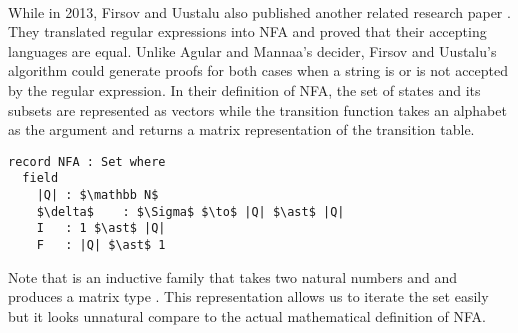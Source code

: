 \paragraph{} While in 2013, Firsov and Uustalu also published another related
research paper \cite{firsov2013}. They translated regular expressions
into NFA and proved that their accepting languages are
equal. Unlike Agular and Mannaa's decider, Firsov and Uustalu's
algorithm could generate proofs for both cases when a string is or is not
accepted by the regular expression. In their definition of NFA, the set of states
 and its subsets are represented as vectors while the transition function
\mb{\delta} takes an alphabet as the argument and returns a matrix
representation of the transition table. 
\begin{lstlisting}[mathescape=true,xleftmargin=.3\textwidth]
record NFA : Set where
  field
    |Q| : $\mathbb N$
    $\delta$    : $\Sigma$ $\to$ |Q| $\ast$ |Q|
    I   : 1 $\ast$ |Q|
    F   : |Q| $\ast$ 1
\end{lstlisting}

\par Note that \mb{\_\ast\_} is an inductive family that takes two
natural numbers  and  and
produces a matrix type . This representation allows us to
iterate the set easily but it looks unnatural compare to the actual 
mathematical definition of NFA. 